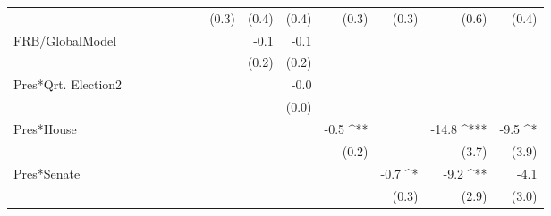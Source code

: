 \documentclass[a4paper]{article}\usepackage{graphicx, color}
\begin{document}
\begin{table}[ht]
\begin{center}
{\begin{tabular}{ l D{.}{.}{1}D{.}{.}{1}D{.}{.}{1}D{.}{.}{1}D{.}{.}{1}D{.}{.}{1}D{.}{.}{1}D{.}{.}{1}D{.}{.}{1}D{.}{.}{1}D{.}{.}{1}D{.}{.}{1}D{.}{.}{1} }
                     &                 &                 &                 &                 &                 &                 & (0.3)           & (0.4)           & (0.4)           & (0.3)           & (0.3)           & (0.6)           & (0.4)          \\ 
FRB/GlobalModel      &                 &                 &                 &                 &                 &                 &                 & -0.1            & -0.1            &                 &                 &                 &                \\ 
                     &                 &                 &                 &                 &                 &                 &                 & (0.2)           & (0.2)           &                 &                 &                 &                \\ 
Pres*Qrt. Election2  &                 &                 &                 &                 &                 &                 &                 &                 & -0.0            &                 &                 &                 &                \\ 
                     &                 &                 &                 &                 &                 &                 &                 &                 & (0.0)           &                 &                 &                 &                \\ 
Pres*House           &                 &                 &                 &                 &                 &                 &                 &                 &                 & -0.5 ^{**}      &                 & -14.8 ^{***}    & -9.5 ^*        \\ 
                     &                 &                 &                 &                 &                 &                 &                 &                 &                 & (0.2)           &                 & (3.7)           & (3.9)          \\ 
Pres*Senate          &                 &                 &                 &                 &                 &                 &                 &                 &                 &                 & -0.7 ^*         & -9.2 ^{**}      & -4.1           \\ 
                     &                 &                 &                 &                 &                 &                 &                 &                 &                 &                 & (0.3)           & (2.9)           & (3.0)          \\ 

\end{tabular}}
\end{center}
\end{table}
\end{document}
